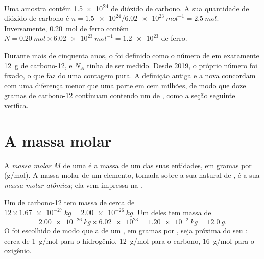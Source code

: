 \begin{example}\label{ex:g10:the-mole:convert}
Uma amostra contém \num{1.5e24}  de dióxido de carbono. A sua
quantidade de dióxido de carbono é
$n = \num{1.5e24} / \qty{6.02e23}{mol^{-1}} = \qty{2.5}{mol}$.
Inversamente, \qty{0.20}{mol} de ferro contêm
$N = \qty{0.20}{mol} \times \qty{6.02e23}{mol^{-1}} = \num{1.2e23}$
 de ferro.
\end{example}

\begin{remark}\label{rem:g10:the-mole:origin}
Durante mais de cinquenta anos, o  foi definido como o número de
 em exatamente \qty{12}{g} de carbono-12, e $N_A$ tinha de ser
medido. Desde 2019, o próprio número foi fixado, o que faz do  uma
contagem pura. A definição antiga e a nova concordam com uma diferença
menor que uma parte em cem milhões, de modo que doze gramas de
carbono-12 continuam contendo um  de , como a seção seguinte
verifica.
\end{remark}

\section{A massa molar}

\begin{definition}\label{def:g10:the-mole:molar-mass}
A \emph{massa molar} $M$ de uma  é a
massa de um  das suas entidades, em gramas por  (\si{g/mol}). A
massa molar de um elemento, tomada sobre a sua  natural de
, é a sua \emph{massa molar atômica};
ela vem impressa na .
\end{definition}

\begin{example}\label{ex:g10:the-mole:carbon}
Um  de carbono-12 tem massa de cerca de
$12 \times \qty{1.67e-27}{kg} = \qty{2.00e-26}{kg}$. Um  deles
tem massa de
\[
  \qty{2.00e-26}{kg} \times \num{6.02e23} = \qty{1.20e-2}{kg}
  = \qty{12.0}{g}.
\]
O  foi escolhido de modo que a  de um , em gramas por
, seja próxima do seu : cerca de \qty{1}{g/mol} para o
hidrogênio, \qty{12}{g/mol} para o carbono, \qty{16}{g/mol} para o
oxigênio.
\end{example}

